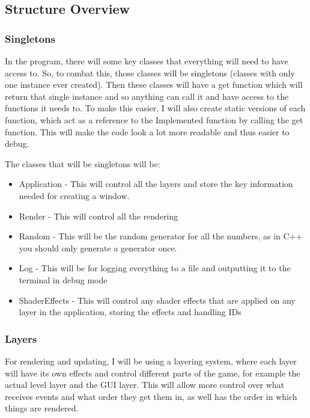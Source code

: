 \documentclass{article}
\begin{document}
        \subsection{Structure Overview}
            \subsubsection{Singletons}
                In the program, there will some key classes that everything will need to have access to. So, to combat this, those classes will be singletons (classes with only one instance ever created). Then these classes will have a get function which will return that single instance and so anything can call it and have access to the functions it needs to. To make this easier, I will also create static versions of each function, which act as a reference to the Implemented function by calling the get function. This will make the code look a lot more readable and thus easier to debug.

                The classes that will be singletons will be:
                \begin{itemize}
                    \item Application - This will control all the layers and store the key information needed for creating a window.
                    \item Render - This will control all the rendering
                    \item Random - This will be the random generator for all the numbers, as in C++ you should only generate a generator once.
                    \item Log - This will be for logging everything to a file and outputting it to the terminal in debug mode
                    \item ShaderEffects - This will control any shader effects that are applied on any layer in the application, storing the effects and handling IDs
                \end{itemize}
            \subsubsection{Layers}
                For rendering and updating, I will be using a layering system, where each layer will have its own effects and control different parts of the game, for example the actual level layer and the GUI layer. This will allow more control over what receives events and what order they get them in, as well has the order in which things are rendered.
\end{document}
